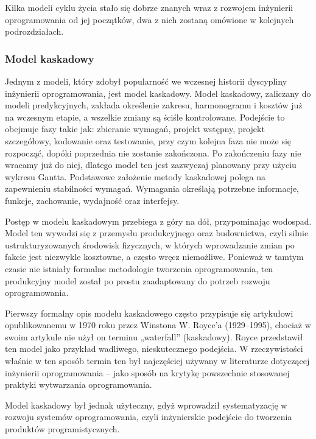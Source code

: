 Kilka modeli cyklu życia stało się dobrze znanych wraz z rozwojem inżynierii oprogramowania od jej początków, dwa z nich zostaną omówione w kolejnych podrozdziałach.

\subsubsection{Model kaskadowy}

Jednym z modeli, który zdobył popularność we wczesnej historii dyscypliny inżynierii oprogramowania, jest model kaskadowy. \autocite{sommerville2015software} Model kaskadowy, zaliczany do modeli predykcyjnych, zakłada określenie zakresu, harmonogramu i kosztów już na wczesnym etapie, a wszelkie zmiany są ściśle kontrolowane. Podejście to obejmuje fazy takie jak: zbieranie wymagań, projekt wstępny, projekt szczegółowy, kodowanie oraz testowanie, przy czym kolejna faza nie może się rozpocząć, dopóki poprzednia nie zostanie zakończona. \autocite{swebok} Po zakończeniu fazy nie wracamy już do niej, dlatego model ten jest zazwyczaj planowany przy użyciu wykresu Gantta. Podstawowe założenie metody kaskadowej polega na zapewnieniu stabilności wymagań. Wymagania określają potrzebne informacje, funkcje, zachowanie, wydajność oraz interfejsy. \autocite{arora2016analysis}

Postęp w modelu kaskadowym przebiega z góry na dół, przypominając wodospad. Model ten wywodzi się z przemysłu produkcyjnego oraz budownictwa, czyli silnie ustrukturyzowanych środowisk fizycznych, w których wprowadzanie zmian po fakcie jest niezwykle kosztowne, a często wręcz niemożliwe. Ponieważ w tamtym czasie nie istniały formalne metodologie tworzenia oprogramowania, ten produkcyjny model został po prostu zaadaptowany do potrzeb rozwoju oprogramowania. \autocite{SDLC}

Pierwszy formalny opis modelu kaskadowego często przypisuje się artykułowi opublikowanemu w 1970 roku przez Winstona W. Royce'a (1929–1995), \autocite{royce1970} chociaż w swoim artykule nie użył on terminu „waterfall” (kaskadowy). Royce przedstawił ten model jako przykład wadliwego, nieskutecznego podejścia. W rzeczywistości właśnie w ten sposób termin ten był najczęściej używany w literaturze dotyczącej inżynierii oprogramowania – jako sposób na krytykę powszechnie stosowanej praktyki wytwarzania oprogramowania. \autocite{SDLC}

Model kaskadowy był jednak użyteczny, gdyż wprowadził systematyzację w rozwoju systemów oprogramowania, czyli inżynierskie podejście do tworzenia produktów programistycznych. \autocite{swebok}

